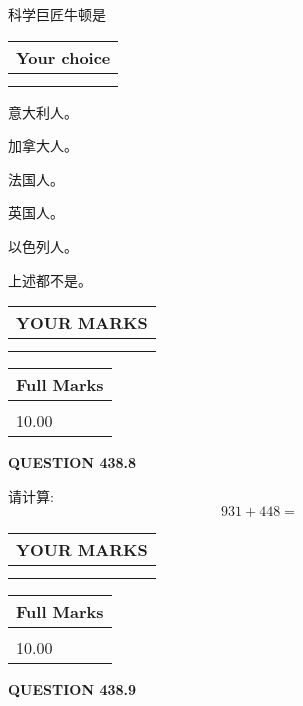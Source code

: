 \documentclass{ctexart}
\begin{document}
  
科学巨匠牛顿是
  
  
\noindent\hspace{3.0in} \begin{tabular}{|l|}
\hline
Your choice \\
\hline
 \\ 
 \\ 
\hline
\end{tabular}
  
  
 
 
意大利人。
 
 
加拿大人。
 
 
法国人。
 
 
英国人。
 
 
以色列人。
 
 
 上述都不是。
 
 
  
\vspace{0.2in}
  
\noindent\begin{tabular}{|l|}
\hline
 YOUR MARKS  \\
\hline
 \\ 
 \\ 
\hline
\end{tabular}
\hspace{0.05in} \begin{tabular}{|l|}
\hline
 Full Marks  \\
\hline
 \\ 
10.00 \\
\hline
\end{tabular}
{\textbf{\Large{QUESTION
438.8 
}}}
  
  
 
请计算:
\begin{equation}
931 +  %
448 = \nonumber
\end{equation}
 

 

 
  
\vspace{0.2in}
  
\noindent\begin{tabular}{|l|}
\hline
 YOUR MARKS  \\
\hline
 \\ 
 \\ 
\hline
\end{tabular}
\hspace{0.05in} \begin{tabular}{|l|}
\hline
 Full Marks  \\
\hline
 \\ 
10.00 \\
\hline
\end{tabular}
{\textbf{\Large{QUESTION
438.9 
}}}
  
\end{document}
